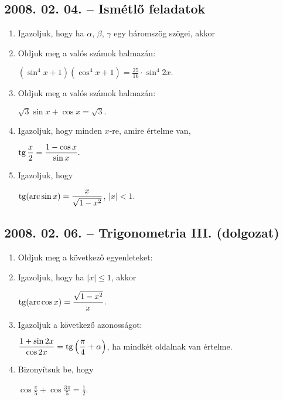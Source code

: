 \subsection*{2008. 02. 04. -- Ismétlő feladatok}
\begin{enumerate}
\item Igazoljuk, hogy ha $\alpha$, $\beta$, $\gamma$ egy háromszög szögei, akkor
\item Oldjuk meg a valós számok halmazán:

$\displaystyle\left(\sin^4x+1\right)\left(\cos^4x+1\right)=\frac{25}{16}\cdot\sin^4 2x.$
\item Oldjuk meg a valós számok halmazán:

$\sqrt{3}\sin x+\cos x=\sqrt{3}.$
\item Igazoljuk, hogy minden $x$-re, amire értelme van,

$\displaystyle\mathop{\mathrm{tg}}\nolimits\dfrac{x}{2}=\frac{1-\cos x}{\sin x}.$
\item Igazoljuk, hogy 

$\displaystyle\mathop{\mathrm{tg}}\nolimits(\mathop{\mathrm{arc}}\nolimits\sin x)=\frac{x}{\sqrt{1-x^2}}$, $|x|<1$.
\end{enumerate}

\subsection*{2008. 02. 06. -- Trigonometria III. (dolgozat)}
\begin{enumerate}
\item Oldjuk meg a következő egyenleteket:
\item Igazoljuk, hogy ha $|x| \le 1$, akkor

$\displaystyle{\mathop{\mathrm{tg}}\nolimits(\mathop{\mathrm{arc}}\nolimits\cos x)=\frac{\sqrt{1-x^2}}{x}}$.

\item Igazoljuk a következő azonosságot:

$\displaystyle{\frac{1+\sin 2x}{\cos 2x}=\mathop{\mathrm{tg}}\nolimits\left(\frac{\pi}{4}+\alpha\right)}$, ha mindkét oldalnak van értelme.
\item Bizonyítsuk be, hogy

$\displaystyle{\cos\frac{\pi}{5}+\cos\frac{3\pi}{5}=\frac{1}{2}}$.
\end{enumerate}

